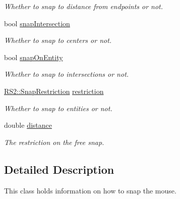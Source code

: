 \begin{DoxyCompactItemize}
\begin{DoxyCompactList}\small\item\em Whether to snap to distance from endpoints or not. \end{DoxyCompactList}\item 
\hypertarget{structRS__SnapMode_ab8dece9c0357653b484abe8b1a8f01ec}{bool \hyperlink{structRS__SnapMode_ab8dece9c0357653b484abe8b1a8f01ec}{snap\-Intersection}}\label{structRS__SnapMode_ab8dece9c0357653b484abe8b1a8f01ec}

\begin{DoxyCompactList}\small\item\em Whether to snap to centers or not. \end{DoxyCompactList}\item 
\hypertarget{structRS__SnapMode_af09acd36fc2cc4ef1ec34715f2159667}{bool \hyperlink{structRS__SnapMode_af09acd36fc2cc4ef1ec34715f2159667}{snap\-On\-Entity}}\label{structRS__SnapMode_af09acd36fc2cc4ef1ec34715f2159667}

\begin{DoxyCompactList}\small\item\em Whether to snap to intersections or not. \end{DoxyCompactList}\item 
\hypertarget{structRS__SnapMode_a3c0363120474f907621fcbfa075156d7}{\hyperlink{classRS2_aac67b6890a08cff619c0fbef48377bae}{R\-S2\-::\-Snap\-Restriction} \hyperlink{structRS__SnapMode_a3c0363120474f907621fcbfa075156d7}{restriction}}\label{structRS__SnapMode_a3c0363120474f907621fcbfa075156d7}

\begin{DoxyCompactList}\small\item\em Whether to snap to entities or not. \end{DoxyCompactList}\item 
\hypertarget{structRS__SnapMode_a53d66fa4caaae122e52db9fb331f24e5}{double \hyperlink{structRS__SnapMode_a53d66fa4caaae122e52db9fb331f24e5}{distance}}\label{structRS__SnapMode_a53d66fa4caaae122e52db9fb331f24e5}

\begin{DoxyCompactList}\small\item\em The restriction on the free snap. \end{DoxyCompactList}\end{DoxyCompactItemize}


\subsection{Detailed Description}
This class holds information on how to snap the mouse.


